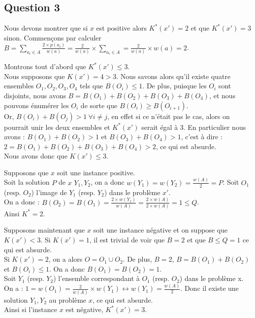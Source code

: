 \subsection{Question 3}\label{ex10_q3}
Nous devons montrer que si $x$ est positive alors $K^*(x') = 2$ et que $K^*(x') = 3$
sinon.
Commençons par calculer $B = \sum_{a_i \in A} \frac{2 \times p(a_i)}{w(a)} =
\frac{2}{w(a)} \times \sum_{a_{i} \in A} = \frac{2}{w(a)} \times w(a) = 2$.

Montrons tout d'abord que $K^*(x') \leq 3$.\\
Nous supposons que $K(x') = 4 > 3$. Nous savons alors qu'il existe quatre ensembles
$O_1,O_2,O_3,O_4$ tels que $B(O_i) \leq 1$.
De plus, puisque les $O_i$ sont disjoints, nous avons $B = B(O_1)+B(O_2)+B(O_3)+B(O_4)$,
et nous pouvons énumérer les $O_i$ de sorte que $B(O_i) \geq B(O_{i+1})$.\\
Or, $B(O_i) + B(O_j) > 1\ \forall i \neq j$, en effet si ce n'était pas le cas, alors on
pourrait unir les deux ensembles et $K^*(x')$ serait égal à 3.
En particulier nous avons : $B(O_1)+B(O_2) > 1$ et $B(O_3)+B(O_4) > 1$, c'est à dire :
$2 = B(O_1) + B(O_2) + B(O_3) + B(O_4) > 2$, ce qui est absurde.\\
Nous avons donc que $K(x') \leq 3$.

Supposons que $x$ soit une instance positive.\\
Soit la solution $P$ de $x$ $Y_1,Y_2$, on a donc $w(Y_1) = w(Y_2) = \frac{w(A)}{2} = P$.
Soit $O_1$ (resp. $O_2$) l'image de $Y_1$ (resp. $Y_2$) dans le problème $x'$.\\
On a donc : $B(O_2) = B(O_1) = \frac{2 \times w(Y_1)}{w(A)} = \frac{2 \times w(A)}{2
\times w(A)} = 1 \leq Q$.\\
Ainsi $K^* = 2$.

Supposons maintenant que $x$ soit une instance négative et on suppose que $K(x') < 3$.
Si $K(x') = 1$, il est trivial de voir que $B = 2$ et que $B \leq Q = 1$ ce qui est
absurde.\\
Si $K(x') = 2$, on a alors $O = O_1 \cup O_2$. 
De plus, $B = 2$, $B = B(O_1) + B(O_2)$ et $B(O_i) \leq 1$.
On a donc $B(O_1) = B(O_2) = 1$.\\
Soit $Y_1$ (resp. $Y_2$) l'ensemble correspondant à $O_1$ (resp. $O_2$) dans le problème
x. On a :
$1 = w(O_1) = \frac{2}{w(A)} \times w(Y_1) \leftrightarrow w(Y_1) = \frac{w(A)}{2}$.
Donc il existe une solution $Y_1,Y_2$ au problème $x$, ce qui est absurde.\\
Ainsi si l'instance $x$ est négative, $K^*(x') = 3$.

